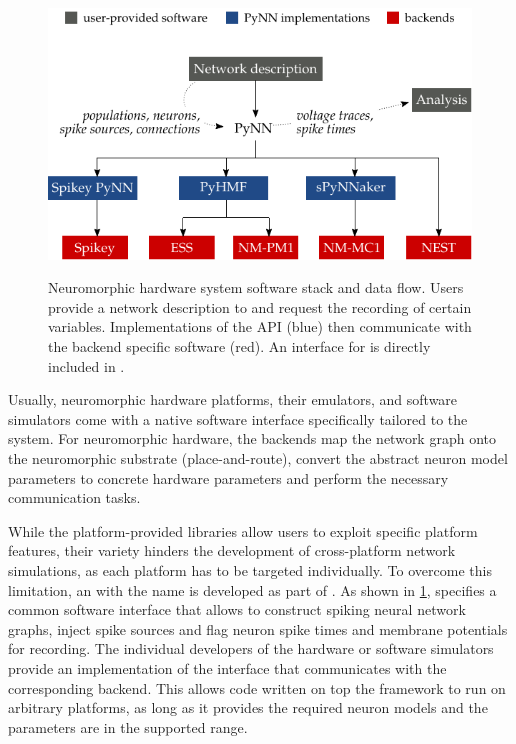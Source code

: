 \begin{figure}
	\centering
	\includegraphics{media/chp2/pynn_software_stack.pdf}\\
	\caption[Neuromorphic hardware system software stack and data flow]{Neuromorphic hardware system software stack and data flow. Users provide a network description to \PyNN and request the recording of certain variables. Implementations of the \PyNN \acrshort{API} (blue) then communicate with the backend specific software (red). An interface for \NEST is directly included in \PyNN.}
	\label{fig:pynn_software_stack}
\end{figure}

Usually, neuromorphic hardware platforms, their emulators, and software simulators come with a native software interface specifically tailored to the system. For neuromorphic hardware, the backends map the network graph onto the neuromorphic substrate (place-and-route), convert the abstract neuron model parameters to concrete hardware parameters and perform the necessary communication tasks.

While the platform-provided libraries allow users to exploit specific platform features, their variety hinders the development of cross-platform network simulations, as each platform has to be targeted individually. To overcome this limitation, an \API with the name \PyNN is developed as part of \HBP \cite{davison2008pynn}. As shown in \cref{fig:pynn_software_stack}, \PyNN specifies a common software interface that allows to construct spiking neural network graphs, inject spike sources and flag neuron spike times and membrane potentials for recording. The individual developers of the hardware or software simulators provide an implementation of the \PyNN interface that communicates with the corresponding backend. This allows code written on top the \PyNN framework to run on arbitrary platforms, as long as it provides the required neuron models and the parameters are in the supported range.

